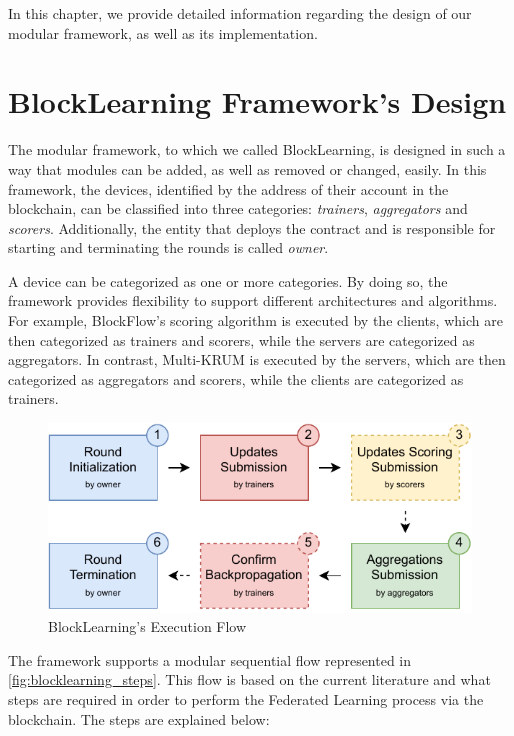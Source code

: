 In this chapter, we provide detailed information regarding the design of our modular framework, as well as its implementation.

\section{BlockLearning Framework's Design}\label{framework:design}

The modular framework, to which we called BlockLearning, is designed in such a way that modules can be added, as well as removed or changed, easily. In this framework, the devices, identified by the address of their account in the blockchain, can be classified into three categories: \textit{trainers}, \textit{aggregators} and \textit{scorers}. Additionally, the entity that deploys the contract and is responsible for starting and terminating the rounds is called \textit{owner}.

A device can be categorized as one or more categories. By doing so, the framework provides flexibility to support different architectures and algorithms. For example, BlockFlow's scoring algorithm is executed by the clients, which are then categorized as trainers and scorers, while the servers are categorized as aggregators. In contrast, Multi-KRUM is executed by the servers, which are then categorized as aggregators and scorers, while the clients are categorized as trainers.

\begin{figure}[!ht]
    \centering
    \includegraphics[width=1\textwidth]{graphics/sequence.pdf}
    \caption{BlockLearning's Execution Flow}
    \label{fig:blocklearning_steps}
\end{figure}

The framework supports a modular sequential flow represented in \autoref{fig:blocklearning_steps}. This flow is based on the current literature and what steps are required in order to perform the Federated Learning process via the blockchain. The steps are explained below:

